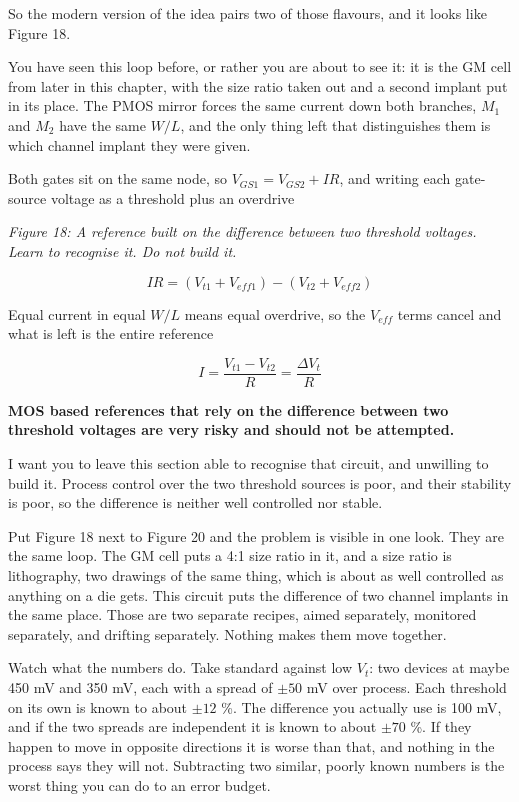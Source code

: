 So the modern version of the idea pairs two of those flavours, and it
looks like Figure 18.

You have seen this loop before, or rather you are about to see it: it is
the GM cell from later in this chapter, with the size ratio taken out
and a second implant put in its place. The PMOS mirror forces the same
current down both branches, \(M_1\) and \(M_2\) have the same \(W/L\),
and the only thing left that distinguishes them is which channel implant
they were given.

Both gates sit on the same node, so \(V_{GS1} = V_{GS2} + I R\), and
writing each gate-source voltage as a threshold plus an overdrive


{
\centering
{}
}

\emph{Figure 18: A reference built on the difference between two
threshold voltages. Learn to recognise it. Do not build it. }

\[ I R = (V_{t1} + V_{eff1}) - (V_{t2} + V_{eff2}) \]

Equal current in equal \(W/L\) means equal overdrive, so the \(V_{eff}\)
terms cancel and what is left is the entire reference

\[ I = \frac{V_{t1} - V_{t2}}{R} = \frac{\Delta V_t}{R} \]

\textbf{MOS based references that rely on the difference between two
threshold voltages are very risky and should not be attempted.}

I want you to leave this section able to recognise that circuit, and
unwilling to build it. Process control over the two threshold sources is
poor, and their stability is poor, so the difference is neither well
controlled nor stable.

Put Figure 18 next to Figure 20 and the problem is visible in one look.
They are the same loop. The GM cell puts a 4:1 size ratio in it, and a
size ratio is lithography, two drawings of the same thing, which is
about as well controlled as anything on a die gets. This circuit puts
the difference of two channel implants in the same place. Those are two
separate recipes, aimed separately, monitored separately, and drifting
separately. Nothing makes them move together.

Watch what the numbers do. Take standard against low \(V_t\): two
devices at maybe 450 mV and 350 mV, each with a spread of \(\pm 50\) mV
over process. Each threshold on its own is known to about \(\pm 12\) \%.
The difference you actually use is 100 mV, and if the two spreads are
independent it is known to about \(\pm 70\) \%. If they happen to move
in opposite directions it is worse than that, and nothing in the process
says they will not. Subtracting two similar, poorly known numbers is the
worst thing you can do to an error budget.

